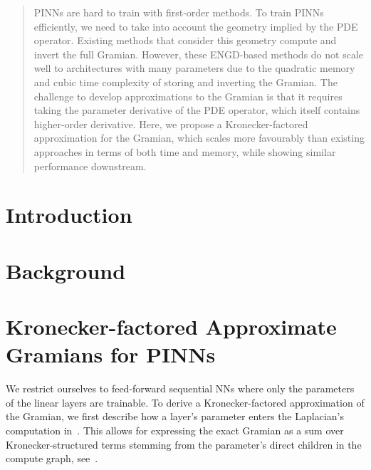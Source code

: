 \documentclass{article}
\begin{document}
\maketitle

\begin{abstract}
  PINNs are hard to train with first-order methods.
  To train PINNs efficiently, we need to take into account the geometry implied by the PDE operator.
  Existing methods that consider this geometry compute and invert the full Gramian.
  However, these ENGD-based methods do not scale well to architectures with many parameters due to the quadratic memory and cubic time complexity of storing and inverting the Gramian.
  The challenge to develop approximations to the Gramian is that it requires taking the parameter derivative of the PDE operator, which itself contains higher-order derivative.
  Here, we propose a Kronecker-factored approximation for the Gramian, which scales more favourably than existing approaches in terms of both time and memory, while showing similar performance downstream.
\end{abstract}


\section{Introduction}



\section{Background}





\section{Kronecker-factored Approximate Gramians for PINNs}

We restrict ourselves to feed-forward sequential NNs where only the parameters of the linear layers are trainable.
To derive a Kronecker-factored approximation of the Gramian, we first describe how a layer's parameter enters the Laplacian's computation in~.
This allows for expressing the exact Gramian as a sum over Kronecker-structured terms stemming from the parameter's direct children in the compute graph, see~.
\end{document}
